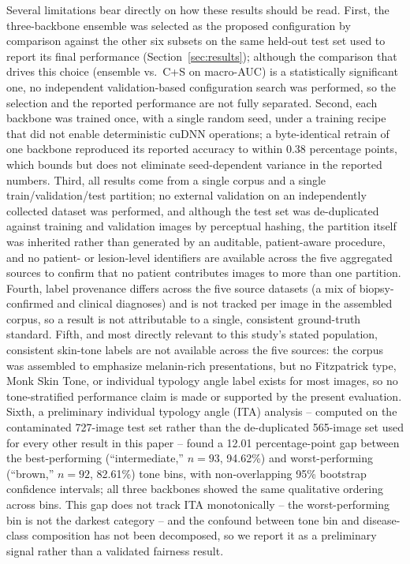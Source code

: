 \documentclass[VANCOUVER,twocolumn]{USG}
\begin{document}
Several limitations bear directly on how these results should be read.
First, the three-backbone ensemble was selected as the proposed
configuration by comparison against the other six subsets on the same
held-out test set used to report its final performance
(Section~\ref{sec:results}); although the comparison that drives this
choice (ensemble vs.\ C+S on macro-AUC) is a statistically significant
one, no independent validation-based configuration search was performed,
so the selection and the reported performance are not fully separated.
Second, each backbone was trained once, with a single random seed, under a
training recipe that did not enable deterministic cuDNN operations; a
byte-identical retrain of one backbone reproduced its reported accuracy to
within 0.38 percentage points, which bounds but does not eliminate
seed-dependent variance in the reported numbers. Third, all results come
from a single corpus and a single train/validation/test partition; no
external validation on an independently collected dataset was performed,
and although the test set was de-duplicated against training and
validation images by perceptual hashing, the partition itself was
inherited rather than generated by an auditable, patient-aware procedure,
and no patient- or lesion-level identifiers are available across the five
aggregated sources to confirm that no patient contributes images to more
than one partition. Fourth, label provenance differs across the five
source datasets (a mix of biopsy-confirmed and clinical diagnoses) and is
not tracked per image in the assembled corpus, so a result is not
attributable to a single, consistent ground-truth standard. Fifth, and
most directly relevant to this study's stated population, consistent
skin-tone labels are not available across the five sources: the corpus was
assembled to emphasize melanin-rich presentations, but no Fitzpatrick
type, Monk Skin Tone, or individual typology angle label exists for most
images, so no tone-stratified performance claim is made or supported by
the present evaluation. Sixth, a preliminary individual typology angle
(ITA) analysis -- computed on the contaminated 727-image test set rather
than the de-duplicated 565-image set used for every other result in this
paper -- found a 12.01 percentage-point gap between the best-performing
(``intermediate,'' $n=93$, 94.62\%) and worst-performing (``brown,''
$n=92$, 82.61\%) tone bins, with non-overlapping 95\% bootstrap confidence
intervals; all three backbones showed the same qualitative ordering across
bins. This gap does not track ITA monotonically -- the worst-performing
bin is not the darkest category -- and the confound between tone bin and
disease-class composition has not been decomposed, so we report it as a
preliminary signal rather than a validated fairness result.
\end{document}
